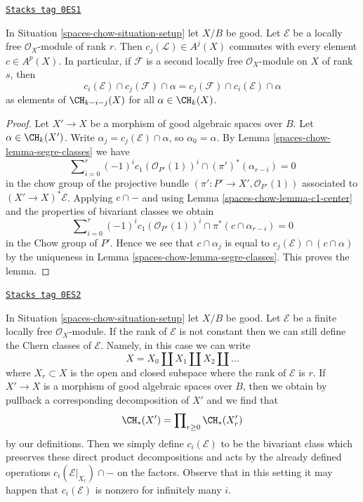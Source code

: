 \begin{lemma}
\label{spaces-chow-lemma-cap-commutative-chern}
\href{https://stacks.math.columbia.edu/tag/0ES1}{\texttt{Stacks tag 0ES1}}

In Situation \ref{spaces-chow-situation-setup} let $X/B$ be good.
Let $\mathcal{E}$ be a locally free $\mathcal{O}_X$-module of rank $r$.
Then $c_j(\mathcal{L}) \in A^j(X)$ commutes with every
element $c \in A^p(X)$. In particular, if $\mathcal{F}$ is a
second locally free $\mathcal{O}_X$-module on $X$ of rank $s$, then
$$
c_i(\mathcal{E}) \cap c_j(\mathcal{F}) \cap \alpha
=
c_j(\mathcal{F}) \cap c_i(\mathcal{E}) \cap \alpha
$$
as elements of $\CH_{k - i - j}(X)$ for all $\alpha \in \CH_k(X)$.
\end{lemma}

\begin{proof}
Let $X' \to X$ be a morphism of good algebraic spaces over $B$.
Let $\alpha \in \CH_k(X')$. Write $\alpha_j = c_j(\mathcal{E}) \cap \alpha$, so
$\alpha_0 = \alpha$. By Lemma \ref{spaces-chow-lemma-segre-classes} we have
$$
\sum\nolimits_{i = 0}^r
(-1)^i c_1(\mathcal{O}_{P'}(1))^i \cap
(\pi')^*(\alpha_{r - i}) = 0
$$
in the chow group of the projective bundle
$(\pi' : P' \to X', \mathcal{O}_{P'}(1))$
associated to $(X' \to X)^*\mathcal{E}$.
Applying $c \cap -$ and using Lemma \ref{spaces-chow-lemma-c1-center}
and the properties of bivariant classes we obtain
$$
\sum\nolimits_{i = 0}^r
(-1)^i c_1(\mathcal{O}_{P'}(1))^i \cap
\pi^*(c \cap \alpha_{r - i}) = 0
$$
in the Chow group of $P'$. Hence we see that $c \cap \alpha_j$ is
equal to $c_j(\mathcal{E}) \cap (c \cap \alpha)$ by the uniqueness in
Lemma \ref{spaces-chow-lemma-segre-classes}. This proves the lemma.
\end{proof}

\begin{remark}
\label{spaces-chow-remark-extend-to-finite-locally-free}
\href{https://stacks.math.columbia.edu/tag/0ES2}{\texttt{Stacks tag 0ES2}}

In Situation \ref{spaces-chow-situation-setup} let $X/B$ be good.
Let $\mathcal{E}$ be a finite locally free $\mathcal{O}_X$-module.
If the rank of $\mathcal{E}$ is not constant then we can
still define the Chern classes of $\mathcal{E}$. Namely, in this
case we can write
$$
X = X_0 \amalg X_1 \amalg X_2 \amalg \ldots
$$
where $X_r \subset X$ is the open and closed subspace where
the rank of $\mathcal{E}$ is $r$. If $X' \to X$ is a morphism
of good algebraic spaces over $B$, then we obtain by
pullback a corresponding decomposition of $X'$ and we find that
$$
\CH_*(X') = \prod\nolimits_{r \geq 0} \CH_*(X'_r)
$$
by our definitions. Then we simply define $c_i(\mathcal{E})$
to be the bivariant class which preserves these direct
product decompositions and acts by the already defined
operations $c_i(\mathcal{E}|_{X_r}) \cap -$
on the factors. Observe that in this setting it may happen
that $c_i(\mathcal{E})$ is nonzero for infinitely many $i$.
\end{remark}

